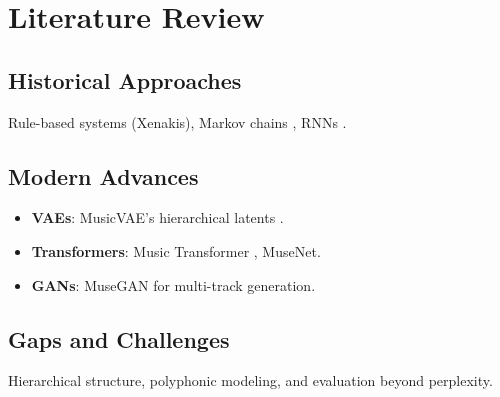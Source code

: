 \chapter{Literature Review}
\section{Historical Approaches}
Rule-based systems (Xenakis), Markov chains \cite{carvalho2019markov}, RNNs \cite{eck2002learning}.

\section{Modern Advances}
\begin{itemize}
    \item \textbf{VAEs}: MusicVAE’s hierarchical latents \cite{roberts2018hierarchical}.
    \item \textbf{Transformers}: Music Transformer \cite{huang2018music}, MuseNet.
    \item \textbf{GANs}: MuseGAN \cite{dong2017musegan} for multi-track generation.
\end{itemize}

\section{Gaps and Challenges}
Hierarchical structure, polyphonic modeling, and evaluation beyond perplexity.

